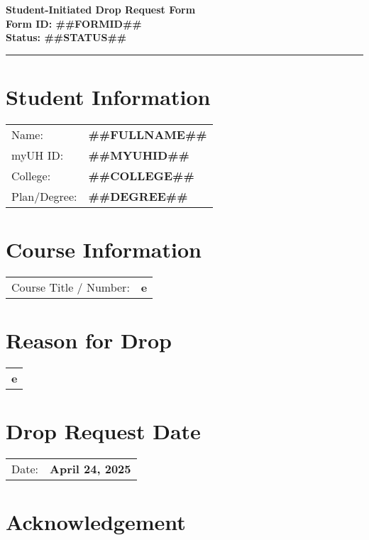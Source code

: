 \documentclass[12pt]{article}
\begin{document}
\begin{center}
  \textbf{\Large Student-Initiated Drop Request Form}\\[0.2cm]
  \textbf{Form ID: ##FORMID##}\\[0.2cm]
  \textbf{Status: ##STATUS##}
\end{center}

\hrule
\vspace{0.5cm}

\section*{Student Information}
\begin{tabular}{ll}
Name: & \textbf{##FULLNAME##} \\
myUH ID: & \textbf{##MYUHID##} \\
College: & \textbf{##COLLEGE##} \\
Plan/Degree: & \textbf{##DEGREE##} \\
\end{tabular}

\vspace{0.5cm}

\section*{Course Information}
\begin{tabular}{ll}
Course Title / Number: & \textbf{e} \\
\end{tabular}

\section*{Reason for Drop}
\begin{tabular}{p{12cm}}
\textbf{e}
\end{tabular}

\section*{Drop Request Date}
\begin{tabular}{ll}
Date: & \textbf{April 24, 2025} \\
\end{tabular}

\section*{Acknowledgement}
\noindent{}
\end{document}
